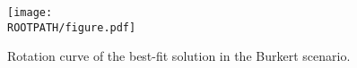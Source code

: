 \begin{figure}%
	\centering%
	\texttt{[image: \\ROOTPATH/figure.pdf]}
	\caption{Rotation curve of the best-fit solution in the Burkert scenario.}%
	\label{fig:burkert:vrot}%
\end{figure}